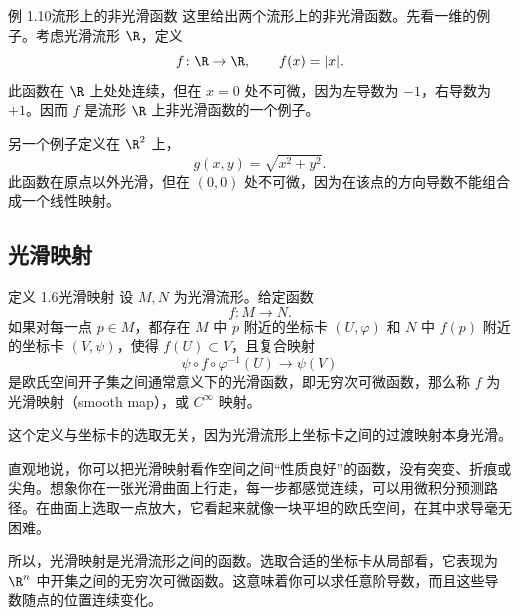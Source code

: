 \begin{statement}{例 1.10}{流形上的非光滑函数}
这里给出两个流形上的非光滑函数。先看一维的例子。考虑光滑流形 $\R$，定义
\[
  f\colon\R\to\R,\qquad f(x)=|x|.
\]
此函数在 $\R$ 上处处连续，但在 $x=0$ 处不可微，因为左导数为 $-1$，右导数为 $+1$。因而 $f$ 是流形 $\R$ 上非光滑函数的一个例子。

另一个例子定义在 $\R^2$ 上，
\[
  g(x,y)=\sqrt{x^2+y^2}.
\]
此函数在原点以外光滑，但在 $(0,0)$ 处不可微，因为在该点的方向导数不能组合成一个线性映射。
\end{statement}

\subsection{光滑映射}
\begin{statement}{定义 1.6}{光滑映射}
设 $M,N$ 为光滑流形。给定函数
\[
  f\colon M\to N.
\]
如果对每一点 $p\in M$，都存在 $M$ 中 $p$ 附近的坐标卡 $(U,\varphi)$ 和 $N$ 中 $f(p)$ 附近的坐标卡 $(V,\psi)$，使得 $f(U)\subset V$，且复合映射
\[
  \psi\circ f\circ\varphi^{-1}(U)\longrightarrow\psi(V)
\]
是欧氏空间开子集之间通常意义下的光滑函数，即无穷次可微函数，那么称 $f$ 为光滑映射（smooth map），或 $C^\infty$ 映射。

这个定义与坐标卡的选取无关，因为光滑流形上坐标卡之间的过渡映射本身光滑。

直观地说，你可以把光滑映射看作空间之间“性质良好”的函数，没有突变、折痕或尖角。想象你在一张光滑曲面上行走，每一步都感觉连续，可以用微积分预测路径。在曲面上选取一点放大，它看起来就像一块平坦的欧氏空间，在其中求导毫无困难。

所以，光滑映射是光滑流形之间的函数。选取合适的坐标卡从局部看，它表现为 $\R^n$ 中开集之间的无穷次可微函数。这意味着你可以求任意阶导数，而且这些导数随点的位置连续变化。
\end{statement}

